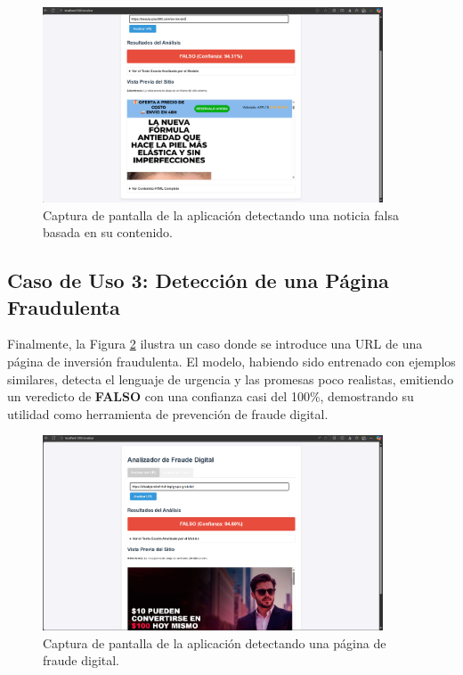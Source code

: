 \begin{figure}[htbp]
    \centering
    \includegraphics[width=0.9\textwidth]{Imagenes/app_falsa1.png} %
    \caption{Captura de pantalla de la aplicación detectando una noticia falsa basada en su contenido.}
    \label{fig:app_falsa1}
\end{figure}

\subsection{Caso de Uso 3: Detección de una Página Fraudulenta}
Finalmente, la Figura \ref{fig:app_falsa2} ilustra un caso donde se introduce una URL de una página de inversión fraudulenta. El modelo, habiendo sido entrenado con ejemplos similares, detecta el lenguaje de urgencia y las promesas poco realistas, emitiendo un veredicto de \textbf{FALSO} con una confianza casi del 100\%, demostrando su utilidad como herramienta de prevención de fraude digital.

\begin{figure}[htbp]
    \centering
    \includegraphics[width=0.9\textwidth]{Imagenes/app_falsa2.png} %
    \caption{Captura de pantalla de la aplicación detectando una página de fraude digital.}
    \label{fig:app_falsa2}
\end{figure}